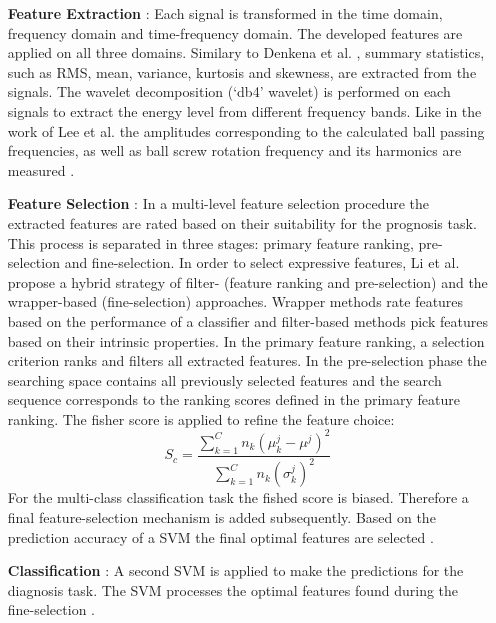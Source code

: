 \begin{itemize}
    \item [\textbf{Feature Extraction}]: Each signal is transformed in the time domain, frequency domain and time-frequency domain. The developed features are applied on all three domains. Similary to Denkena et al. \cite{Denkena2021}, summary statistics, such as RMS, mean, variance, kurtosis and skewness, are extracted from the signals. The wavelet decomposition (‘db4’ wavelet) is performed on each signals to extract the energy level from different frequency bands. Like in the work of Lee et al. \cite{Lee2015} the amplitudes corresponding to the calculated ball passing frequencies, as well as ball screw rotation frequency and its harmonics are measured \cite{LiPin2018}.
    \item [\textbf{Feature Selection}]: In a multi-level feature selection procedure the extracted features are rated based on their suitability for the prognosis task. This process is separated in three stages: primary feature ranking, pre-selection and fine-selection. In order to select expressive features, Li et al. \cite{LiPin2018} propose a hybrid strategy of filter- (feature ranking and pre-selection) and the wrapper-based (fine-selection) approaches. Wrapper methods rate features based on the performance of a classifier and filter-based methods pick features based on their intrinsic properties. In the primary feature ranking, a selection criterion ranks and filters all extracted features. In the pre-selection phase the searching space contains all previously selected features and the search sequence corresponds to the ranking scores defined in the primary feature ranking. The fisher score is applied to refine the feature choice:
    \begin{equation}
        S_{c} = \frac{\sum_{k=1}^{C} n_{k}(\mu_{k}^{j}-\mu^{j})^{2}}{\sum_{k=1}^{C}n_{k}(\sigma_{k}^{j})^{2}}
    \end{equation}
    For the multi-class classification task the fished score is biased. Therefore a final feature-selection mechanism is added subsequently. Based on the prediction accuracy of a SVM the final optimal features are selected \cite{LiPin2018}.
    \item [\textbf{Classification}]: A second SVM is applied to make the predictions for the diagnosis task. The SVM processes the optimal features found during the fine-selection \cite{LiPin2018}. 
\end{itemize}


